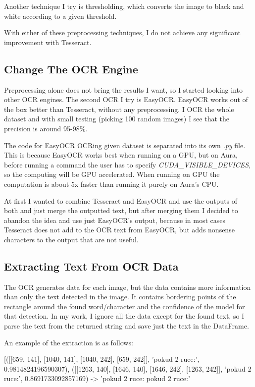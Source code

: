 \documentclass[
  digital,     %
  oneside,     %
  nosansbold,  %
  nocolorbold, %
  nolof,         %
  nolot,         %
]{fithesis4}
\begin{document}
Another technique I try is thresholding, which converts the image to black and white according to a given threshold.

With either of these preprocessing techniques, I do not achieve any significant improvement with Tesseract.

\subsection{Change The OCR Engine}

Preprocessing alone does not bring the results I want, so I started looking into other OCR engines. The second OCR I try is EasyOCR. EasyOCR works out of the box better than Tesseract, without any preprocessing. I OCR the whole dataset and with small testing (picking 100 random images) I see that the precision is around 95-98\%.

The code for EasyOCR OCRing given dataset is separated into its own \emph{.py} file. This is because EasyOCR works best when running on a GPU, but on Aura, before running a command the user has to specify \emph{CUDA\_VISIBLE\_DEVICES}, so the computing will be GPU accelerated. When running on GPU the computation is about 5x faster than running it purely on Aura's CPU.

At first I wanted to combine Tesseract and EasyOCR and use the outputs of both and just merge the outputted text, but after merging them I decided to abandon the idea and use just EasyOCR's output, because in most cases Tesseract does not add to the OCR text from EasyOCR, but adds nonsense characters to the output that are not useful.

\subsection{Extracting Text From OCR Data}

The OCR generates data for each image, but the data contains more information than only the text detected in the image. It contains bordering points of the rectangle around the found word/character and the confidence of the model for that detection. In my work, I ignore all the data except for the found text, so I parse the text from the returned string and save just the text in the DataFrame.

An example of the extraction is as follows:

[([[659, 141], [1040, 141], [1040, 242], [659, 242]], 'pokud 2 ruce:', 0.9814824196590307), ([[1263, 140], [1646, 140], [1646, 242], [1263, 242]], 'pokud 2 ruce:', 0.8691733092857169) -> 'pokud 2 ruce: pokud 2 ruce:'
\end{document}
